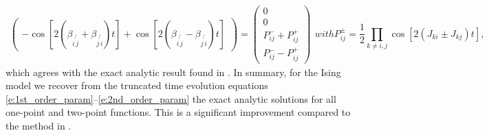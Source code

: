 \documentclass[aps,prl,showpacs,amsmath,amssymb,superscriptaddress,reprint,10pt]{revtex4-1}
\begin{document}
\begin{widetext}
\begin{subequations}
\begin{align}
\begin{pmatrix}
        -\cos\left[2(\beta_{i\not{\,j}}+\beta_{j\not{\,i}})t\right]+\cos\left[2(\beta_{i\not{\,j}}-\beta_{j\not{\,i}})t\right]
       \end{pmatrix}
 =
 \begin{pmatrix}
        0\\
        0\\
        P_{ij}^-+P_{ij}^+\\
        P_{ij}^--P_{ij}^+
       \end{pmatrix}
\end{align}
with
\begin{equation}
P_{ij}^\pm=\frac{1}{2}\prod_{k\neq i,j}\cos\left[2(J_{ki}\pm J_{kj})t\right],
\end{equation}
\end{subequations}
which agrees with the exact analytic result found in \cite{vdWorm_etal13}. In summary, for the Ising model we recover from the truncated time evolution equations \eqref{e:1st_order_param}--\eqref{e:2nd_order_param} the exact analytic solutions for all one-point and two-point functions. This is a significant improvement compared to the method in \cite{Schachenmayer_etal15}.
\end{widetext}

%
\end{document}
